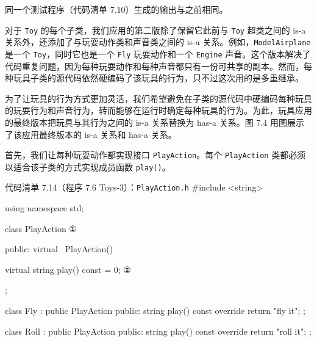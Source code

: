 同一个测试程序（代码清单 7.10）生成的输出与之前相同。

对于 \texttt{Toy} 的每个子类，我们应用的第二版除了保留它此前与 \texttt{Toy} 超类之间的 is-a 关系外，还添加了与玩耍动作类和声音类之间的 is-a 关系。例如，\texttt{Model\allowbreak{}Airplane} 是一个 \texttt{Toy}，同时它也是一个 \texttt{Fly} 玩耍动作和一个 \texttt{Engine} 声音。这个版本解决了代码重复问题，因为每种玩耍动作和每种声音都只有一份可共享的副本。然而，每种玩具子类的源代码依然硬编码了该玩具的行为，只不过这次用的是多重继承。

为了让玩具的行为方式更加灵活，我们希望避免在子类的源代码中硬编码每种玩具的玩耍行为和声音行为，转而能够在运行时确定每种玩具的行为。为此，玩具应用的最终版本把玩具与其行为之间的 is-a 关系替换为 has-a 关系。图 7.4 用图展示了该应用最终版本的 is-a 关系和 has-a 关系。


首先，我们让每种玩耍动作都实现接口 \texttt{Play\allowbreak{}Action}。每个 \texttt{Play\allowbreak{}Action} 类都必须以适合该子类的方式实现成员函数 \texttt{play()}。

\begin{codeboxt}{代码清单 7.14（程序 7.6 Toys-3）：\texttt{Play\allowbreak{}Action.\allowbreak{}h}}
#include <string>

using namespace std;

class PlayAction                     ①
{
public:
    virtual ~PlayAction() {}
 
    virtual string play() const = 0; ②
};

class Fly : public PlayAction
{
public:
    string play() const override { return "fly it"; }
};

class Roll : public PlayAction
{
public:
    string play() const override { return "roll it"; }
};
\end{codeboxt}
\par
{}\par

